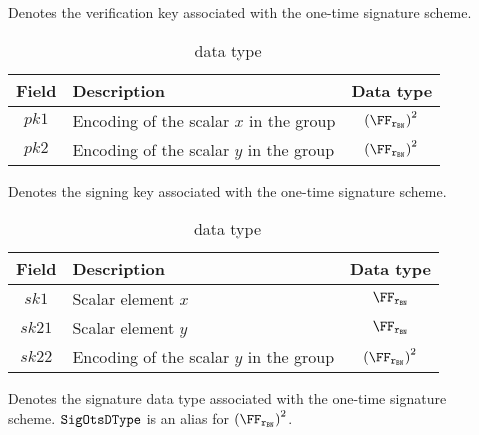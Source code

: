 \begin{description}
    \item[\vkOtsDType] Denotes the verification key associated with the one-time signature scheme.
        \begin{table}[H]
        \centering
        \begin{tabular}{cp{20em}c}
            Field & Description & Data type\\ \toprule
            $pk1$ & Encoding of the scalar $x$ in the group & ${(\FFx{\rBN})}^{2}$ \\ \midrule
            $pk2$ & Encoding of the scalar $y$ in the group & ${(\FFx{\rBN})}^{2}$ \\ \bottomrule
        \end{tabular}
        \caption{\vkOtsDType~data type}\label{instantiation:tab:vk-ots-dtype}
        \end{table}
    \item[\skOtsDType] Denotes the signing key associated with the one-time signature scheme.
        \begin{table}[H]
        \centering
        \begin{tabular}{cp{20em}c}
            Field & Description & Data type\\ \toprule
            $sk1$ & Scalar element $x$ & $\FFx{\rBN}$ \\ \midrule
            $sk21$ & Scalar element $y$ & $\FFx{\rBN}$ \\ \midrule
            $sk22$ & Encoding of the scalar $y$ in the group & ${(\FFx{\rBN})}^{2}$ \\ \bottomrule
        \end{tabular}
        \caption{\skOtsDType~data type}\label{instantiation:tab:sk-ots-dtype}
        \end{table}
    \item[\sigOtsDType] Denotes the signature data type associated with the one-time signature scheme. ${\mathtt{SigOtsDType}}$ is an alias for ${(\FFx{\rBN})}^{2}$.
\end{description}
